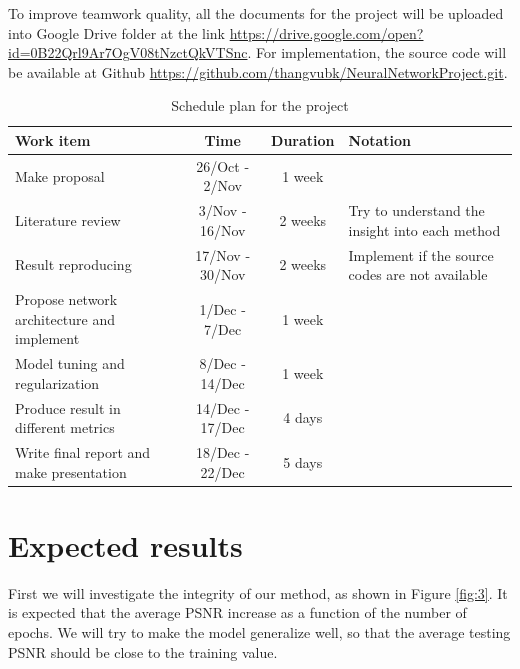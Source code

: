 \documentclass[10pt]{article}
\begin{document}
\noindent
To improve teamwork quality, all the documents for the project will be uploaded into Google Drive folder at the link \url{https://drive.google.com/open?id=0B22Qrl9Ar7OgV08tNzctQkVTSnc}. For implementation, the source code will be available at Github \url{https://github.com/thangvubk/NeuralNetworkProject.git}. 
\begin{table}[H]
\centering
\caption{Schedule plan for the project}
\label{t:1}
\setlength{\tabcolsep}{0.5em} %
{\renewcommand{\arraystretch}{2}%
	\begin{tabular}{L{4cm}ccL{5cm}}
	\hline
	\textbf{Work item}                         & \textbf{Time}   & \textbf{Duration} & \textbf{Notation}                              \\ \hline
	Make proposal                              & 26/Oct - 2/Nov  & 1 week            & \textbf{}                                      \\ \hline
	Literature review                          & 3/Nov - 16/Nov  & 2 weeks           & Try to understand the insight into each method \\ \hline
	Result reproducing                         & 17/Nov - 30/Nov & 2 weeks           & Implement if the source codes are not available \\ \hline
	Propose network architecture and implement & 1/Dec - 7/Dec  & 1 week            &                                                \\ \hline
	Model tuning and regularization            & 8/Dec - 14/Dec  & 1 week            &                                                \\ \hline
	Produce result in different metrics        & 14/Dec - 17/Dec & 4 days            &                                                \\ \hline
	Write final report and make presentation   & 18/Dec - 22/Dec & 5 days            &                                                \\ \hline
	\end{tabular}
}
\end{table}

\section{Expected results} %
\label{sec:expected_results}
First we will investigate the integrity of our method, as shown in Figure \ref{fig:3}. It is expected that the average PSNR increase as a function of the number of epochs. We will try to make the model generalize well, so that the average testing PSNR should be close to the training value.
\end{document}
